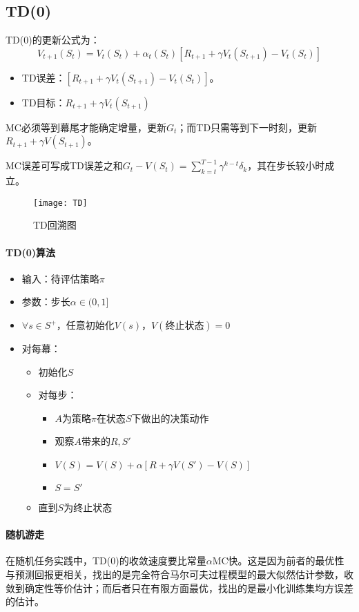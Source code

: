 \documentclass[
12pt, %
a4paper, 
oneside, %
headinclude,footinclude, %
]{scrartcl}
\begin{document}
\subsection{TD(0)}
TD(0)的更新公式为：
$$
V_{t + 1}(S_t) = V_t(S_t) + \alpha_t(S_t)[R_{t + 1} + \gamma V_t(S_{t + 1}) - V_t(S_t)]
$$
\begin{itemize}
\item TD误差：$ [R_{t + 1} + \gamma V_t(S_{t + 1}) - V_t(S_t)] $。
\item TD目标：$ R_{t + 1} + \gamma V_t(S_{t + 1}) $
\end{itemize}

MC必须等到幕尾才能确定增量，更新$ G_t $；而TD只需等到下一时刻，更新$ R_{t + 1} + \gamma V(S_{t + 1}) $。

MC误差可写成TD误差之和$ G_t - V(S_t) = \sum_{k = t}^{T - 1} \gamma^{k - t} \delta_k $，其在步长较小时成立。

\begin{figure}[H]
\centering
\texttt{[image: TD]}
\caption[TD回溯图]{TD回溯图}
\end{figure}
\paragraph{TD(0)算法}
\begin{itemize}
\item 输入：待评估策略$ \pi $
\item 参数：步长$ \alpha \in (0,1] $
\item $ \forall s \in S^+ $，任意初始化$ V(s) $，$ V(\text{终止状态}) = 0 $
\item 对每幕：
\begin{itemize}
\item 初始化$ S $
\item 对每步：
\begin{itemize}
\item $ A $为策略$ \pi $在状态$ S $下做出的决策动作
\item 观察$ A $带来的$ R, S' $
\item $ V(S) = V(S) + \alpha[R + \gamma V(S') - V(S)] $
\item $ S = S' $
\end{itemize}
\item 直到$ S $为终止状态
\end{itemize}
\end{itemize}
\paragraph{随机游走}
在随机任务实践中，TD(0)的收敛速度要比常量$ \alpha $MC快。这是因为前者的最优性与预测回报更相关，找出的是完全符合马尔可夫过程模型的最大似然估计参数，收敛到确定性等价估计；而后者只在有限方面最优，找出的是最小化训练集均方误差的估计。
\end{document}
